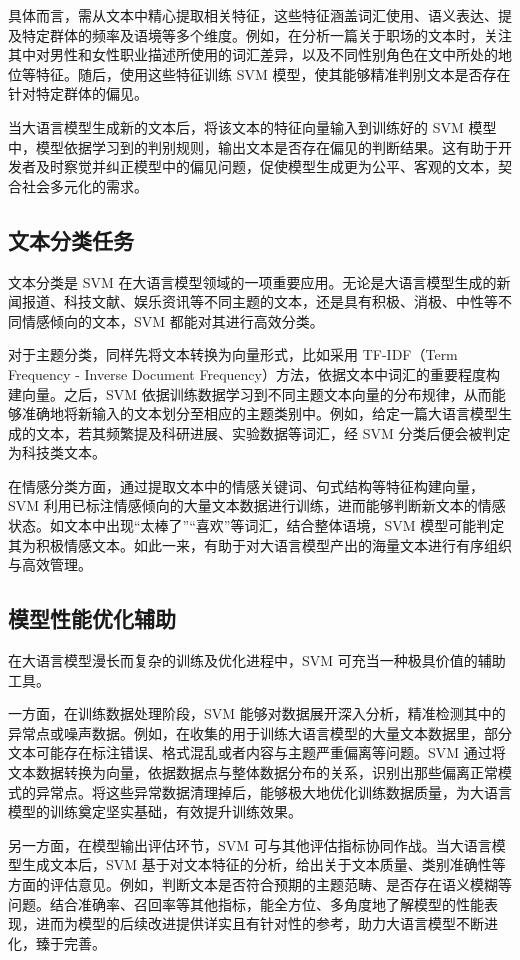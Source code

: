 \documentclass[12pt]{article}
\begin{document}
具体而言，需从文本中精心提取相关特征，这些特征涵盖词汇使用、语义表达、提及特定群体的频率及语境等多个维度。例如，在分析一篇关于职场的文本时，关注其中对男性和女性职业描述所使用的词汇差异，以及不同性别角色在文中所处的地位等特征。随后，使用这些特征训练 SVM 模型，使其能够精准判别文本是否存在针对特定群体的偏见。

当大语言模型生成新的文本后，将该文本的特征向量输入到训练好的 SVM 模型中，模型依据学习到的判别规则，输出文本是否存在偏见的判断结果。这有助于开发者及时察觉并纠正模型中的偏见问题，促使模型生成更为公平、客观的文本，契合社会多元化的需求。

\subsection{文本分类任务}
文本分类是 SVM 在大语言模型领域的一项重要应用。无论是大语言模型生成的新闻报道、科技文献、娱乐资讯等不同主题的文本，还是具有积极、消极、中性等不同情感倾向的文本，SVM 都能对其进行高效分类。

对于主题分类，同样先将文本转换为向量形式，比如采用 TF-IDF（Term Frequency - Inverse Document Frequency）方法，依据文本中词汇的重要程度构建向量。之后，SVM 依据训练数据学习到不同主题文本向量的分布规律，从而能够准确地将新输入的文本划分至相应的主题类别中。例如，给定一篇大语言模型生成的文本，若其频繁提及科研进展、实验数据等词汇，经 SVM 分类后便会被判定为科技类文本。

在情感分类方面，通过提取文本中的情感关键词、句式结构等特征构建向量，SVM 利用已标注情感倾向的大量文本数据进行训练，进而能够判断新文本的情感状态。如文本中出现“太棒了”“喜欢”等词汇，结合整体语境，SVM 模型可能判定其为积极情感文本。如此一来，有助于对大语言模型产出的海量文本进行有序组织与高效管理。

\subsection{模型性能优化辅助}
在大语言模型漫长而复杂的训练及优化进程中，SVM 可充当一种极具价值的辅助工具。

一方面，在训练数据处理阶段，SVM 能够对数据展开深入分析，精准检测其中的异常点或噪声数据。例如，在收集的用于训练大语言模型的大量文本数据里，部分文本可能存在标注错误、格式混乱或者内容与主题严重偏离等问题。SVM 通过将文本数据转换为向量，依据数据点与整体数据分布的关系，识别出那些偏离正常模式的异常点。将这些异常数据清理掉后，能够极大地优化训练数据质量，为大语言模型的训练奠定坚实基础，有效提升训练效果。

另一方面，在模型输出评估环节，SVM 可与其他评估指标协同作战。当大语言模型生成文本后，SVM 基于对文本特征的分析，给出关于文本质量、类别准确性等方面的评估意见。例如，判断文本是否符合预期的主题范畴、是否存在语义模糊等问题。结合准确率、召回率等其他指标，能全方位、多角度地了解模型的性能表现，进而为模型的后续改进提供详实且有针对性的参考，助力大语言模型不断进化，臻于完善。
\end{document}

